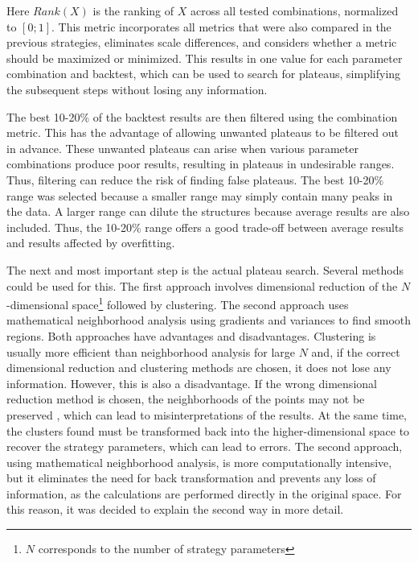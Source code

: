 \noindent
Here $Rank(X)$ is the ranking of $X$ across all tested combinations, normalized to $[0; 1]$.
This metric incorporates all metrics that were also compared in the previous strategies, eliminates scale differences, and considers whether a metric should be maximized or minimized.
This results in one value for each parameter combination and backtest, which can be used to search for plateaus, simplifying the subsequent steps without losing any information.

The best 10-20\% of the backtest results are then filtered using the combination metric.
This has the advantage of allowing unwanted plateaus to be filtered out in advance.
These unwanted plateaus can arise when various parameter combinations produce poor results, resulting in plateaus in undesirable ranges.
Thus, filtering can reduce the risk of finding false plateaus.
The best 10-20\% range was selected because a smaller range may simply contain many peaks in the data.
A larger range can dilute the structures because average results are also included.
Thus, the 10-20\% range offers a good trade-off between average results and results affected by overfitting.

The next and most important step is the actual plateau search.
Several methods could be used for this.
The first approach involves dimensional reduction of the $N$-dimensional space\footnote{$N$ corresponds to the number of strategy parameters} followed by clustering.
The second approach uses mathematical neighborhood analysis using gradients and variances to find smooth regions.
Both approaches have advantages and disadvantages.
Clustering is usually more efficient than neighborhood analysis for large $N$ \cite{cluster-neighbors} and, if the correct dimensional reduction and clustering methods are chosen, it does not lose any information.
However, this is also a disadvantage.
If the wrong dimensional reduction method is chosen, the neighborhoods of the points may not be preserved \cite{cluster-neighbors}, which can lead to misinterpretations of the results.
At the same time, the clusters found must be transformed back into the higher-dimensional space to recover the strategy parameters, which can lead to errors.
The second approach, using mathematical neighborhood analysis, is more computationally intensive, but it eliminates the need for back transformation and prevents any loss of information, as the calculations are performed directly in the original space.
For this reason, it was decided to explain the second way in more detail.

